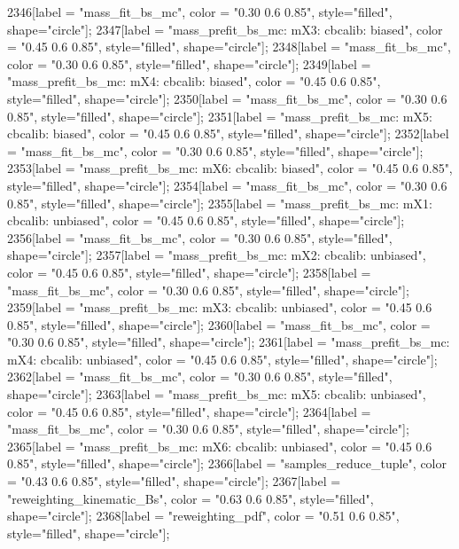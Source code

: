 {	2346[label = "mass_fit_bs_mc", color = "0.30 0.6 0.85", style="filled", shape="circle"];
	2347[label = "mass_prefit_bs_mc\nmassbin: mX3\nmassmodel: cbcalib\ntrigger: biased", color = "0.45 0.6 0.85", style="filled", shape="circle"];
	2348[label = "mass_fit_bs_mc", color = "0.30 0.6 0.85", style="filled", shape="circle"];
	2349[label = "mass_prefit_bs_mc\nmassbin: mX4\nmassmodel: cbcalib\ntrigger: biased", color = "0.45 0.6 0.85", style="filled", shape="circle"];
	2350[label = "mass_fit_bs_mc", color = "0.30 0.6 0.85", style="filled", shape="circle"];
	2351[label = "mass_prefit_bs_mc\nmassbin: mX5\nmassmodel: cbcalib\ntrigger: biased", color = "0.45 0.6 0.85", style="filled", shape="circle"];
	2352[label = "mass_fit_bs_mc", color = "0.30 0.6 0.85", style="filled", shape="circle"];
	2353[label = "mass_prefit_bs_mc\nmassbin: mX6\nmassmodel: cbcalib\ntrigger: biased", color = "0.45 0.6 0.85", style="filled", shape="circle"];
	2354[label = "mass_fit_bs_mc", color = "0.30 0.6 0.85", style="filled", shape="circle"];
	2355[label = "mass_prefit_bs_mc\nmassbin: mX1\nmassmodel: cbcalib\ntrigger: unbiased", color = "0.45 0.6 0.85", style="filled", shape="circle"];
	2356[label = "mass_fit_bs_mc", color = "0.30 0.6 0.85", style="filled", shape="circle"];
	2357[label = "mass_prefit_bs_mc\nmassbin: mX2\nmassmodel: cbcalib\ntrigger: unbiased", color = "0.45 0.6 0.85", style="filled", shape="circle"];
	2358[label = "mass_fit_bs_mc", color = "0.30 0.6 0.85", style="filled", shape="circle"];
	2359[label = "mass_prefit_bs_mc\nmassbin: mX3\nmassmodel: cbcalib\ntrigger: unbiased", color = "0.45 0.6 0.85", style="filled", shape="circle"];
	2360[label = "mass_fit_bs_mc", color = "0.30 0.6 0.85", style="filled", shape="circle"];
	2361[label = "mass_prefit_bs_mc\nmassbin: mX4\nmassmodel: cbcalib\ntrigger: unbiased", color = "0.45 0.6 0.85", style="filled", shape="circle"];
	2362[label = "mass_fit_bs_mc", color = "0.30 0.6 0.85", style="filled", shape="circle"];
	2363[label = "mass_prefit_bs_mc\nmassbin: mX5\nmassmodel: cbcalib\ntrigger: unbiased", color = "0.45 0.6 0.85", style="filled", shape="circle"];
	2364[label = "mass_fit_bs_mc", color = "0.30 0.6 0.85", style="filled", shape="circle"];
	2365[label = "mass_prefit_bs_mc\nmassbin: mX6\nmassmodel: cbcalib\ntrigger: unbiased", color = "0.45 0.6 0.85", style="filled", shape="circle"];
	2366[label = "samples_reduce_tuple", color = "0.43 0.6 0.85", style="filled", shape="circle"];
	2367[label = "reweighting_kinematic_Bs", color = "0.63 0.6 0.85", style="filled", shape="circle"];
	2368[label = "reweighting_pdf", color = "0.51 0.6 0.85", style="filled", shape="circle"];
}
